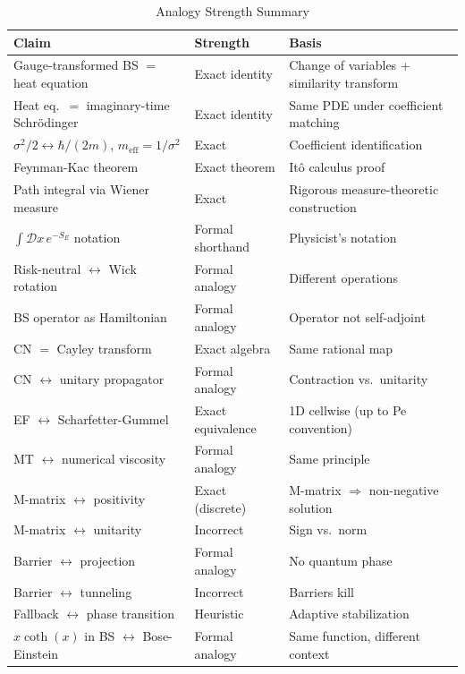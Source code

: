 \begin{table}[!t]
\centering
\caption{Analogy Strength Summary}
\label{tab:report-card}
\begin{tabular}{lll}
\toprule
\textbf{Claim} & \textbf{Strength} & \textbf{Basis} \\
\midrule
Gauge-transformed BS $=$ heat equation & Exact identity & Change of variables + similarity transform \\
Heat eq.\ $=$ imaginary-time Schr\"{o}dinger & Exact identity & Same PDE under coefficient matching \\
$\sigma^2/2 \leftrightarrow \hbar/(2m)$, $m_{\text{eff}} = 1/\sigma^2$ & Exact & Coefficient identification \\
Feynman-Kac theorem & Exact theorem & It\^{o} calculus proof \\
Path integral via Wiener measure & Exact & Rigorous measure-theoretic construction \\
$\int\mathcal{D}x\,e^{-S_E}$ notation & Formal shorthand & Physicist's notation \\
Risk-neutral $\leftrightarrow$ Wick rotation & Formal analogy & Different operations \\
BS operator as Hamiltonian & Formal analogy & Operator not self-adjoint \\
CN $=$ Cayley transform & Exact algebra & Same rational map \\
CN $\leftrightarrow$ unitary propagator & Formal analogy & Contraction vs.\ unitarity \\
EF $\leftrightarrow$ Scharfetter-Gummel & Exact equivalence & 1D cellwise (up to Pe convention) \\
MT $\leftrightarrow$ numerical viscosity & Formal analogy & Same principle \\
M-matrix $\leftrightarrow$ positivity & Exact (discrete) & M-matrix $\Rightarrow$ non-negative solution \\
M-matrix $\leftrightarrow$ unitarity & Incorrect & Sign vs.\ norm \\
Barrier $\leftrightarrow$ projection & Formal analogy & No quantum phase \\
Barrier $\leftrightarrow$ tunneling & Incorrect & Barriers kill \\
Fallback $\leftrightarrow$ phase transition & Heuristic & Adaptive stabilization \\
$x\coth(x)$ in BS $\leftrightarrow$ Bose-Einstein & Formal analogy & Same function, different context \\
\bottomrule
\end{tabular}
\end{table}

